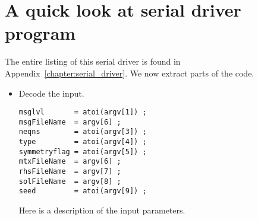 \section{A quick look at serial driver program}
\label{section:Bridge:quick-look-serial-driver}
\par
The entire listing of this serial driver is found in
Appendix~\ref{chapter:serial_driver}.
We now extract parts of the code.
\begin{itemize}
\item Decode the input.
\par
\begin{verbatim}
msglvl       = atoi(argv[1]) ;
msgFileName  = argv[6] ;
neqns        = atoi(argv[3]) ;
type         = atoi(argv[4]) ;
symmetryflag = atoi(argv[5]) ;
mtxFileName  = argv[6] ;
rhsFileName  = argv[7] ;
solFileName  = argv[8] ;
seed         = atoi(argv[9]) ;
\end{verbatim}
Here is a description of the input parameters.


\end{itemize}
